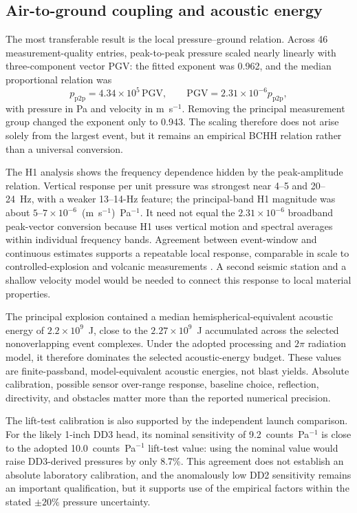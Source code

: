\documentclass[]{seismica}
\begin{document}
\subsection{Air-to-ground coupling and acoustic energy}

The most transferable result is the local pressure--ground relation. Across 46
measurement-quality entries, peak-to-peak pressure scaled nearly linearly with
three-component vector PGV: the fitted exponent was 0.962, and the median
proportional relation was
\[
 p_{\mathrm{p2p}}=4.34\times10^5\,\mathrm{PGV},
 \qquad
 \mathrm{PGV}=2.31\times10^{-6}p_{\mathrm{p2p}},
\]
with pressure in Pa and velocity in m~s$^{-1}$. Removing the principal
measurement group changed the exponent only to 0.943. The scaling therefore
does not arise solely from the largest event, but it remains an empirical BCHH
relation rather than a universal conversion.

The H1 analysis shows the frequency dependence hidden by the peak-amplitude
relation. Vertical response per unit pressure was strongest near 4--5 and
20--24~Hz, with a weaker 13--14-Hz feature; the principal-band H1 magnitude was
about $5$--$7\times10^{-6}$~(m~s$^{-1}$)~Pa$^{-1}$. It need not equal the
$2.31\times10^{-6}$ broadband peak-vector conversion because H1 uses vertical
motion and spectral averages within individual frequency bands. Agreement
between event-window and continuous estimates supports a repeatable local
response, comparable in scale to controlled-explosion and volcanic
measurements \citep{novoselov_ground_coupling_2020}. A second seismic station
and a shallow velocity model would be needed to connect this response to local
material properties.

The principal explosion contained a median hemispherical-equivalent acoustic
energy of $2.2\times10^9$~J, close to the $2.27\times10^9$~J accumulated across
the selected nonoverlapping event complexes. Under the adopted processing and
$2\pi$ radiation model, it therefore dominates the selected acoustic-energy
budget. These values are finite-passband, model-equivalent acoustic energies,
not blast yields. Absolute calibration, possible sensor over-range response,
baseline choice, reflection, directivity, and obstacles matter more than the
reported numerical precision.

The lift-test calibration is also supported by the independent launch
comparison. For the likely 1-inch DD3 head, its nominal sensitivity of
9.2~counts~Pa$^{-1}$ is close to the adopted 10.0~counts~Pa$^{-1}$ lift-test
value: using the nominal value would raise DD3-derived pressures by only
8.7\%. This agreement does not establish an absolute laboratory calibration,
and the anomalously low DD2 sensitivity remains an important qualification,
but it supports use of the empirical factors within the stated $\pm20\%$
pressure uncertainty.
\end{document}
